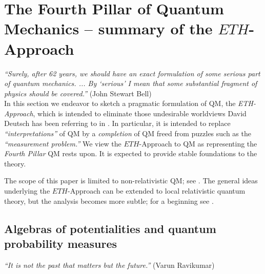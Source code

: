 \documentclass[a4paper,11pt]{article}
\begin{document}
\section{The Fourth Pillar of Quantum Mechanics -- summary of the $\mathbf{\textit{ETH}}$-Approach}\label{ETH}

\hspace{0.5cm}\textit{``Surely, after 62 years, we should have an exact formulation of some serious part of quantum mechanics. ... By `serious' I mean that some substantial fragment of physics should be covered.''} (John Stewart Bell)\\

In this section we endeavor to sketch a pragmatic formulation of QM, the \textit{ETH-Approach}, which is intended to 
eliminate those undesirable worldviews David Deutsch has been referring to in \cite{Deutsch}. In particular, it is intended
 to replace \textit{``interpretations''} of QM by a \textit{completion} of QM freed from puzzles such as the 
 \textit{``measurement problem.''} We view the $ETH$-Approach to QM as representing the \textit{Fourth Pillar} QM rests 
 upon. It is expected to provide stable foundations to the theory.
 
 The scope of this paper is limited to non-relativistic QM; see  
 \cite{BFS, Fr1}. The general ideas underlying the $ETH$-Approach can be extended to local relativistic 
 quantum theory, but the analysis becomes more subtle; for a beginning see \cite{Fr2}.
 
  \subsection{Algebras of potentialities and quantum probability measures}
 
 \hspace{0.5cm}\textit{``It is not the past that matters but the future.''} (Varun Ravikumar)
 
\end{document}
